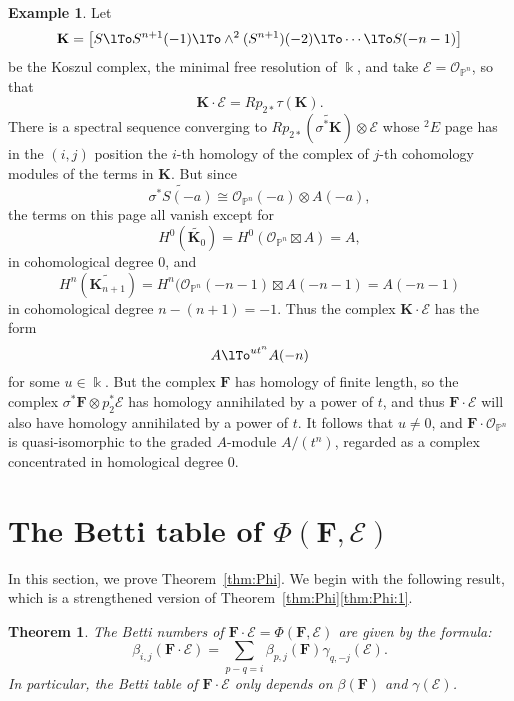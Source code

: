 \documentclass[12pt]{amsart}
\newtheorem{theorem}[lemma]{Theorem}
\theoremstyle{definition}
\newtheorem{example}[lemma]{Example}
\theoremstyle{remark}
\newcommand{\kk}{\Bbbk}
\newcommand{\PP}{\mathbb{P}}
\newcommand{\cO}{\mathcal{O}}
\newcommand{\cE}{\mathcal{E}}
\newcommand{\bK}{\mathbf{K}}
\newcommand{\FF}{\mathbf{F}}
\begin{document}
\begin{example} Let 
$$
\bK = \bigl[ S\lTo S^{n+1}(-1) \lTo \wedge^{2}(S^{n+1})(-2) \lTo\cdots\lTo S(-n-1)\bigr]
$$
be the Koszul complex, the minimal free resolution of $\kk$, and take
$\cE = \cO_{\PP^{n}}$, so that 
$$
\bK \cdot \cE = Rp_{2*}\tau(\bK).$$  
There is a spectral sequence converging to $Rp_{2*}(\widetilde {\sigma^{*}\bK})\otimes \cE$
whose $^{2}E$ page has in the $(i,j)$ position the $i$-th homology of the complex
of $j$-th cohomology modules of the terms in $\bK$. But since
$$
\widetilde {\sigma^{*} S(-a)} \cong \cO_{\PP^{n}}(-a)\otimes A(-a),
$$
the terms on this page all vanish except for
$$
H^{0} (\widetilde{\bK_{0}}) = H^{0}(\cO_{\PP^{n}}\boxtimes A) = A,
$$
in cohomological degree 0, and 
$$
H^{n}(\widetilde{\bK_{n+1}}) = H^{n}(\cO_{\PP^{n}}(-n-1)\boxtimes A(-n-1) = A(-n-1)
$$
in cohomological degree $n-(n+1) = -1$.
Thus the complex $\bK \cdot \cE$ has the form
$$
A\lTo^{ut^{n}}A(-n)
$$
for some $u\in \kk$. But the complex $\FF$ has homology of finite length, so the complex $\sigma^{*}\FF \otimes p_{2}^{*}\cE$ has homology annihilated by a power of $t$, and thus $\FF\cdot \cE$ will also have homology annihilated by a power of $t$. It follows that $u\neq 0$, and $\FF\cdot \cO_{\PP^{n}}$ is quasi-isomorphic to the graded $A$-module $A/(t^{n})$, regarded as a complex concentrated in homological degree 0.
\end{example}


\section{The Betti table of $\Phi(\FF,\cE)$}\label{sec:Betti of Phi}
In this section, we prove Theorem~\ref{thm:Phi}.  We begin with the following result, which is a strengthened version of Theorem~\ref{thm:Phi}\eqref{thm:Phi:1}.
\begin{theorem}\label{thm:betti numbers of pairing}
The Betti numbers of $\FF\cdot \cE = \Phi(\FF,\cE)$ are given by the formula:
\[
\beta_{i,j}(\FF\cdot \cE)=\sum_{p-q=i}  \beta_{p,j}(\FF)\gamma_{q,-j}(\cE).
\]
In particular, the Betti table of $\FF\cdot \cE$ only depends on $\beta(\FF)$ and $\gamma(\cE)$.
\end{theorem}
\end{document}
